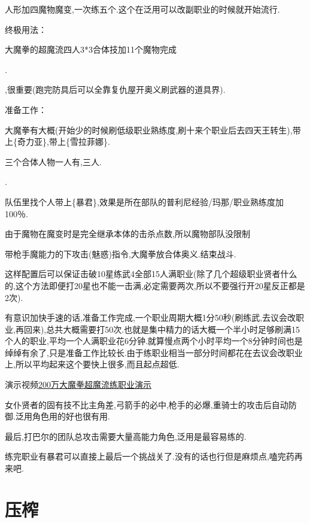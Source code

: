 		人形加四魔物魔变,一次练五个.这个在泛用可以改副职业的时候就开始流行.

		终极用法：

		大魔拳的超魔流四人3*3合体技加11个魔物完成

		{\color{red}{修罗巴尔必备杰洛肯,有男主最好,需要大量千万级能力角色,所以这步可视为修罗巴尔攻略的必经之路}}.

		{\color{red}{记得练上魔女和兔兔莉亚,同步探索魔界收集41武器}},很重要(跑完防具后可以全靠复仇屋开奥义刷武器的道具界).

		准备工作：

		大魔拳有大概{\color{red}{200万能力}}(开始少的时候刷低级职业熟练度,刷十来个职业后去四天王转生),带上{\color{red}{[可靠的伙伴]}}\{奇力亚\},带上{\color{red}{生杀予夺}}\{雪拉菲娜\}.

		三个合体人物一人有{},三人{}.

		{\color{red}{四人放到普利尼部队}}.

		队伍里找个人带上{\color{red}{普利尼教育员}}\{暴君\},效果是所在部队的普利尼经验/玛那/职业熟练度加100％.

		由于魔物在魔变时是完全继承本体的击杀点数,所以魔物部队没限制

		带枪手魔能力的下攻击(魅惑)指令,大魔拳放合体奥义.结束战斗.

		这样配置后可以保证击破10星练武4全部15人满职业(除了几个超级职业贤者什么的,这个方法即便打20星也不能一击满,必定需要两次,所以不要强行开20星反正都是2次).

		有意识加快手速的话,准备工作完成,一个职业周期大概1分50秒(刷练武,去议会改职业,再回来),总共大概需要打50次.也就是集中精力的话大概一个半小时足够刷满15个人的职业,平均一个人满职业花6分钟.就算慢点两个小时平均一个8分钟时间也是绰绰有余了,只是准备工作比较长.由于练职业相当一部分时间都花在去议会改职业上,所以平均起来这个要快上很多,而且起点超低.

		演示视频\href{http://www.bilibili.com/video/av2966618/}{200万大魔拳超魔流练职业演示}

		女仆贤者的固有技不比主角差,弓箭手的必中,枪手的必爆,重骑士的攻击后自动防御.泛用角色用的好也很有用.

		最后,打巴尔的团队总攻击需要大量高能力角色,泛用是最容易练的.

		练完职业有暴君可以直接上最后一个挑战关了.没有的话也行但是麻烦点,嗑完药再来吧.

	\newpage

	\section{压榨}

